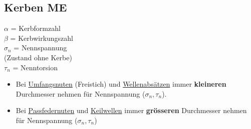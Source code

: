 \subsection{Kerben \hfill ME}
\begin{footnotesize}
    \begin{minipage}{0.58\linewidth}
        \begin{center}
        \end{center}
    \end{minipage}
    \begin{minipage}{0.4\linewidth}
        \begin{scriptsize}
            \begin{center}
                $\alpha$ = Kerbformzahl
                \\$\beta$ = Kerbwirkungszahl 
                \\$\sigma_n$ = Nennspannung
                \\(Zustand ohne Kerbe)
                \\$\tau_n$ = Nenntorsion
            \end{center}
        \end{scriptsize}
    \end{minipage}
    \begin{itemize}
        \item \scriptsize Bei \underline{Umfangsnuten} (Freistich) und \underline{Wellenabsätzen} immer \textbf{kleineren} Durchmesser nehmen für Nennspannung ($\sigma_n, \tau_n$).
        \item \scriptsize Bei \underline{Passfedernuten} und \underline{Keilwellen} immer \textbf{grösseren} Durchmesser nehmen für Nennspannung ($\sigma_n, \tau_n$)
    \end{itemize}
\end{footnotesize}
